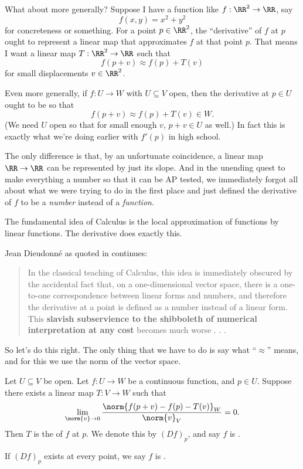 What about more generally?
Suppose I have a function like $f : \RR^2 \to \RR$, say 
\[ f(x,y) = x^2+y^2 \]
for concreteness or something.
For a point $p \in \RR^2$, the ``derivative'' of $f$ at $p$ ought to represent a linear map
that approximates $f$ at that point $p$.
That means I want a linear map $T : \RR^2 \to \RR$ such that
\[ f(p + v) \approx f(p) + T(v) \]
for small displacements $v \in \RR^2$.

Even more generally, if $f : U \to W$ with $U \subseteq V$ open,
then the derivative at $p \in U$ ought to be so that
\[ f(p + v) \approx f(p) + T(v) \in W. \]
(We need $U$ open so that for small enough $v$, $p+v \in U$ as well.)
In fact this is exactly what we're doing earlier with $f'(p)$ in high school.


The only difference is that, by an unfortunate coincidence,
a linear map $\RR \to \RR$ can be represented by just its slope.
And in the unending quest to make everything a number so that it can be AP tested,
we immediately forgot all about what we were trying to do in the first place
and just defined the derivative of $f$ to be a \emph{number} instead of a \emph{function}.

\begin{moral}
	The fundamental idea of Calculus is the local approximation of functions by linear functions.
	The derivative does exactly this.
\end{moral}
Jean Dieudonn\'e as quoted in \cite{ref:pugh} continues:
\begin{quote}
	In the classical teaching of Calculus, this idea is immediately obscured
	by the accidental fact that, on a one-dimensional vector space,
	there is a one-to-one correspondence between linear forms and numbers,
	and therefore the derivative at a point is defined as a number instead of a linear form.
	This \textbf{slavish subservience to the shibboleth of numerical interpretation at any cost}
	becomes much worse . . .
\end{quote}

So let's do this right.
The only thing that we have to do is say what ``$\approx$'' means, and for
this we use the norm of the vector space.
\begin{definition}
	Let $U \subseteq V$ be open.
	Let $f : U \to W$ be a continuous function, and $p \in U$.
	Suppose there exists a linear map $T : V \to W$ such that
	\[
		\lim_{\norm{v} \to 0}
		\frac{\norm{f(p + v) - f(p) - T(v)}_W}{\norm{v}_V} = 0.
	\]
	Then $T$ is the  of $f$ at $p$.
	We denote this by $(Df)_p$, and say $f$ is .

	If $(Df)_p$ exists at every point, we say $f$ is .
\end{definition}

